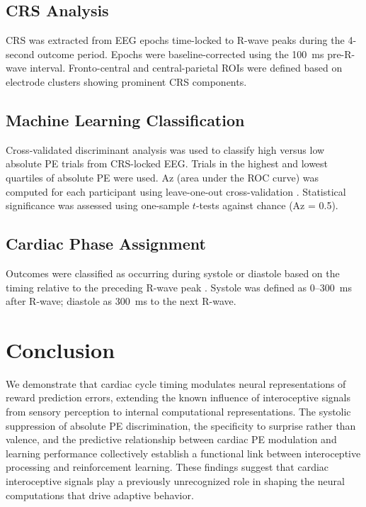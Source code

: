 \documentclass[11pt]{article}
\begin{document}
\subsection{CRS Analysis}

CRS was extracted from EEG epochs time-locked to R-wave peaks during the 4-second outcome period. Epochs were baseline-corrected using the 100~ms pre-R-wave interval. Fronto-central and central-parietal ROIs were defined based on electrode clusters showing prominent CRS components.

\subsection{Machine Learning Classification}

Cross-validated discriminant analysis \citep{discriminant_analysis2009, cross_validation_ml2018} was used to classify high versus low absolute PE trials from CRS-locked EEG. Trials in the highest and lowest quartiles of absolute PE were used. Az (area under the ROC curve) was computed for each participant using leave-one-out cross-validation \citep{az_metric2006}. Statistical significance was assessed using one-sample $t$-tests against chance (Az = 0.5).

\subsection{Cardiac Phase Assignment}

Outcomes were classified as occurring during systole or diastole based on the timing relative to the preceding R-wave peak \citep{systole_diastole2016}. Systole was defined as 0--300~ms after R-wave; diastole as 300~ms to the next R-wave.

\section{Conclusion}

We demonstrate that cardiac cycle timing modulates neural representations of reward prediction errors, extending the known influence of interoceptive signals from sensory perception to internal computational representations. The systolic suppression of absolute PE discrimination, the specificity to surprise rather than valence, and the predictive relationship between cardiac PE modulation and learning performance collectively establish a functional link between interoceptive processing and reinforcement learning. These findings suggest that cardiac interoceptive signals play a previously unrecognized role in shaping the neural computations that drive adaptive behavior.



\end{document}
